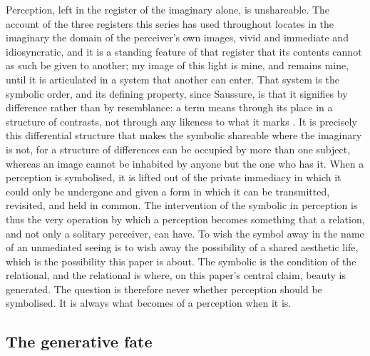 Perception, left in the register of the imaginary alone, is unshareable. The account of the three registers this series has used throughout locates in the imaginary the domain of the perceiver's own images, vivid and immediate and idiosyncratic, and it is a standing feature of that register that its contents cannot as such be given to another; my image of this light is mine, and remains mine, until it is articulated in a system that another can enter. That system is the symbolic order, and its defining property, since Saussure, is that it signifies by difference rather than by resemblance: a term means through its place in a structure of contrasts, not through any likeness to what it marks \parencite{saussure1959}. It is precisely this differential structure that makes the symbolic shareable where the imaginary is not, for a structure of differences can be occupied by more than one subject, whereas an image cannot be inhabited by anyone but the one who has it. When a perception is symbolised, it is lifted out of the private immediacy in which it could only be undergone and given a form in which it can be transmitted, revisited, and held in common. The intervention of the symbolic in perception is thus the very operation by which a perception becomes something that a relation, and not only a solitary perceiver, can have. To wish the symbol away in the name of an unmediated seeing is to wish away the possibility of a shared aesthetic life, which is the possibility this paper is about. The symbolic is the condition of the relational, and the relational is where, on this paper's central claim, beauty is generated. The question is therefore never whether perception should be symbolised. It is always what becomes of a perception when it is.

\subsection{The generative fate}
\label{p23:sub:sym-generative}

